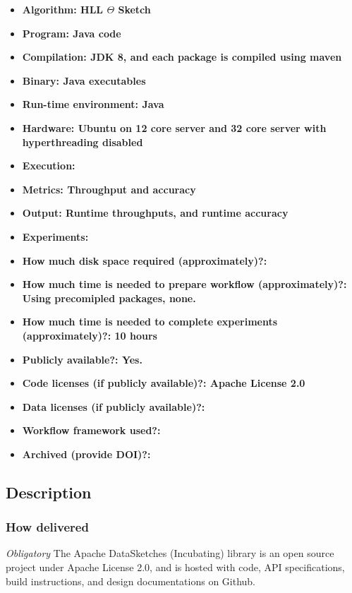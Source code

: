 \documentclass{sigplanconf}
\begin{document}
{\small
\begin{itemize}
  \item {\bf Algorithm: HLL $\Theta$ Sketch}
  \item {\bf Program: Java code}
  \item {\bf Compilation: JDK 8, and each package is compiled using maven}
  \item {\bf Binary: Java executables}
  \item {\bf Run-time environment: Java}
  \item {\bf Hardware: Ubuntu on 12 core server and 32 core server with hyperthreading disabled}
  \item {\bf Execution: }
  \item {\bf Metrics: Throughput and accuracy}
  \item {\bf Output: Runtime throughputs, and runtime accuracy}
  \item {\bf Experiments: }
  \item {\bf How much disk space required (approximately)?: }
  \item {\bf How much time is needed to prepare workflow (approximately)?: Using precomipled packages, none.}
  \item {\bf How much time is needed to complete experiments (approximately)?: 10 hours}
  \item {\bf Publicly available?: Yes.}
  \item {\bf Code licenses (if publicly available)?: Apache License 2.0}
  \item {\bf Data licenses (if publicly available)?: }
  \item {\bf Workflow framework used?: }
  \item {\bf Archived (provide DOI)?: }
\end{itemize}

\subsection{Description}

\subsubsection{How delivered}

{\em Obligatory}
The Apache DataSketches (Incubating) library is an open source project
under Apache License 2.0, and is hosted with code, API specifications,
build instructions, and design documentations on Github.

}
\end{document}

